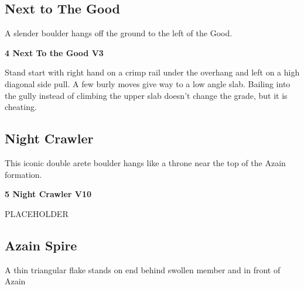 \begin{multicols}{2}
			\subsection*{Next to The Good}\label{bf:Next to The Good}
			\begin{minipage}{\columnwidth}
			A slender boulder hangs off the ground to the left of the Good.
			\end{minipage}
			
					\begin{minipage}{\linewidth}	
					\label{rt:Next To the Good}\colorbox{green!20}{\textbf{4 Next To the Good V3   \warn }}
					\begin{adjustwidth}{0.5cm}{}				
					Stand start with right hand on a crimp rail under the overhang and left on a high diagonal side pull. A few burly moves give way to a low angle slab. Bailing into the gully instead of climbing the upper slab doesn't change the grade, but it is cheating.
					\end{adjustwidth}
					\end{minipage}
			\subsection*{Night Crawler}\label{bf:Night Crawler}
			\begin{minipage}{\columnwidth}
			This iconic double arete boulder hangs like a throne near the top of the Azain formation.
			\end{minipage}
			

					\begin{minipage}{\linewidth}	
					\label{rt:Night Crawler}\colorbox{red!20}{\textbf{5 Night Crawler V10  }}
					\begin{adjustwidth}{0.5cm}{}				
					PLACEHOLDER
					\end{adjustwidth}
					\end{minipage}
			\subsection*{Azain Spire}\label{bf:Azain Spire}
			\begin{minipage}{\columnwidth}
			A thin triangular flake stands on end behind swollen member and in front of Azain
			\end{minipage}
			


\end{multicols}
